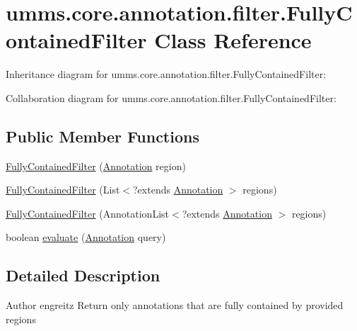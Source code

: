 \hypertarget{classumms_1_1core_1_1annotation_1_1filter_1_1_fully_contained_filter}{\section{umms.\+core.\+annotation.\+filter.\+Fully\+Contained\+Filter Class Reference}
\label{classumms_1_1core_1_1annotation_1_1filter_1_1_fully_contained_filter}
}


Inheritance diagram for umms.\+core.\+annotation.\+filter.\+Fully\+Contained\+Filter\+:


Collaboration diagram for umms.\+core.\+annotation.\+filter.\+Fully\+Contained\+Filter\+:
\subsection*{Public Member Functions}
\begin{DoxyCompactItemize}
\item 
\hyperlink{classumms_1_1core_1_1annotation_1_1filter_1_1_fully_contained_filter_af79b37abbbe424c4dd0f9ce84a3c45ff}{Fully\+Contained\+Filter} (\hyperlink{interfaceumms_1_1core_1_1annotation_1_1_annotation}{Annotation} region)
\item 
\hyperlink{classumms_1_1core_1_1annotation_1_1filter_1_1_fully_contained_filter_a9046379919a58763b8e93dcc1c31bbc1}{Fully\+Contained\+Filter} (List$<$?extends \hyperlink{interfaceumms_1_1core_1_1annotation_1_1_annotation}{Annotation} $>$ regions)
\item 
\hyperlink{classumms_1_1core_1_1annotation_1_1filter_1_1_fully_contained_filter_a7235f045b5ec2d36ff1b3ef3ee2b82f8}{Fully\+Contained\+Filter} (Annotation\+List$<$?extends \hyperlink{interfaceumms_1_1core_1_1annotation_1_1_annotation}{Annotation} $>$ regions)
\item 
boolean \hyperlink{classumms_1_1core_1_1annotation_1_1filter_1_1_fully_contained_filter_afe23a468bd48d7b622e4a17b7182ca71}{evaluate} (\hyperlink{interfaceumms_1_1core_1_1annotation_1_1_annotation}{Annotation} query)
\end{DoxyCompactItemize}


\subsection{Detailed Description}
\begin{DoxyAuthor}{Author}
engreitz Return only annotations that are fully contained by provided regions 
\end{DoxyAuthor}


